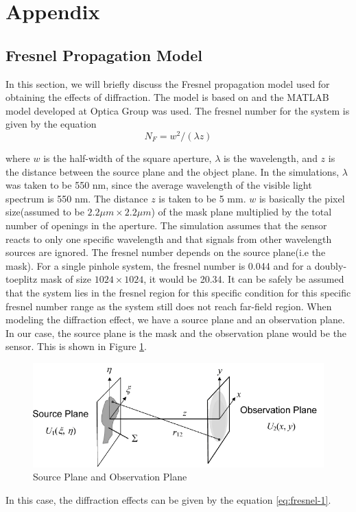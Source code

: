 \chapter*{Appendix}
\section*{Fresnel Propagation Model}
In this section, we will briefly discuss the Fresnel propagation model used for obtaining the effects of diffraction. The model is based on \cite{FourierOptics} and the MATLAB model developed at Optica Group was used.  The fresnel number for the system is given by the equation
\begin{equation}
N_F = w^2/(\lambda z)
\label{eq:fresnel-4}
\end{equation}

where $w$ is the half-width of the square aperture, $\lambda$ is the wavelength, and $z$ is the distance between the source plane and the object plane. In the simulations, $\lambda$ was taken to be 550 nm, since the average wavelength of the visible light spectrum is 550 nm. The distance $z$ is taken to be 5 mm. $w$ is basically the pixel size(assumed to be $2.2 \mu m \times 2.2 \mu m$) of the mask plane multiplied by the total number of openings in the aperture. The simulation assumes that the sensor reacts to only one specific wavelength and that signals from other wavelength sources are ignored. The fresnel number depends on the source plane(i.e the mask). For a single pinhole system, the fresnel number is 0.044 and for a doubly-toeplitz mask of size $1024 \times 1024$, it would be 20.34. It can be safely be assumed that the system lies in the fresnel region for this specific condition for this specific fresnel number range\cite{FourierOptics} as the system still does not reach far-field region. When modeling the diffraction effect, we have a source plane and an observation plane. In our case, the source plane is the mask and the observation plane would be the sensor. This is shown in Figure \ref{fig:fresnel_1}. 
\begin{figure}[!htbp]
\centering
\includegraphics[width = \linewidth]{pics/fresnel-1}
\caption{Source Plane and Observation Plane}
\label{fig:fresnel_1}
\end{figure}
In this case, the diffraction effects can be given by the equation \ref{eq:fresnel-1}.


